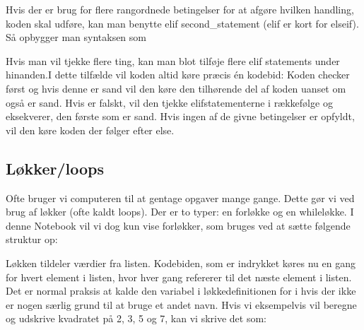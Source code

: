 \documentclass[letterpaper,10pt,english]{jupyterBook}
\begin{document}
Hvis der er brug for flere rangordnede betingelser for at afgøre hvilken handling, koden skal udføre, kan man benytte elif second\_statement (elif er kort for else\sphinxhyphen{}if). Så opbygger man syntaksen som

\begin{sphinxVerbatim}[commandchars=\\\{\}]
 
        
 
         
         
\end{sphinxVerbatim}

Hvis man vil tjekke flere ting, kan man blot tilføje flere elif statements under hinanden.I dette tilfælde vil koden altid køre præcis én kodebid: Koden checker først  og hvis denne er sand vil den  køre den tilhørende del af koden uanset om  også er sand. Hvis  er falskt, vil den tjekke elif\sphinxhyphen{}statementerne i rækkefølge og eksekverer, den første som er sand. Hvis ingen af de givne betingelser er opfyldt, vil den køre koden der følger efter else.


\subsection{Løkker/loops}
\label{\detokenize{notebooks/Andet_python:lokker-loops}}
Ofte bruger vi computeren til at gentage opgaver mange gange. Dette gør vi ved brug af løkker (ofte kaldt loops). Der er to typer: en for\sphinxhyphen{}løkke og en while\sphinxhyphen{}løkke. I denne Notebook vil vi dog kun vise for\sphinxhyphen{}løkker, som bruges ved at sætte følgende struktur op:

\begin{sphinxVerbatim}[commandchars=\\\{\}]
   
        
\end{sphinxVerbatim}

Løkken tildeler  værdier fra listen. Kodebiden, som er indrykket køres nu en gang for hvert element i listen, hvor  hver gang refererer til det næste element i listen. Det er normal praksis at kalde den variabel i løkke\sphinxhyphen{}definitionen for i hvis der ikke er nogen særlig grund til at bruge et andet navn. Hvis vi eksempelvis vil beregne og udskrive kvadratet på 2, 3, 5 og 7, kan vi skrive det som:
\end{document}
